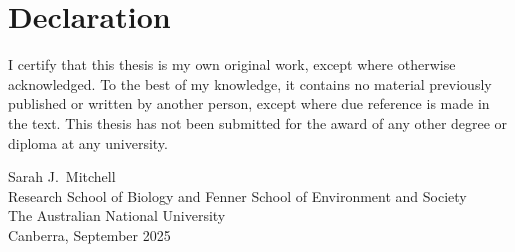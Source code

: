 \chapter*{Declaration}

\vspace{12pt}

I certify that this thesis is my own original work, except where otherwise
acknowledged. To the best of my knowledge, it contains no material previously
published or written by another person, except where due reference is made in
the text. This thesis has not been submitted for the award of any other degree
or diploma at any university.

\vspace{18pt}

\noindent Sarah J.\ Mitchell\\[2pt]
Research School of Biology and Fenner School of Environment and Society\\
The Australian National University\\[4pt]
Canberra, September 2025

\clearpage

